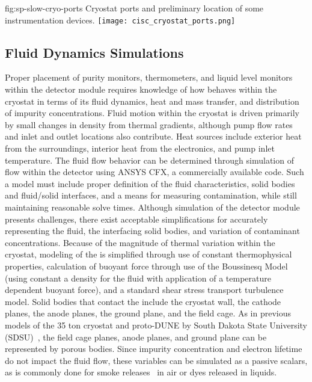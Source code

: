 \begin{dunefigure}{fig:sp-slow-cryo-ports}
{Cryostat ports and preliminary location of some instrumentation devices. }
\texttt{[image: cisc\_cryostat\_ports.png]}
\end{dunefigure}




\subsection{Fluid Dynamics Simulations}
\label{sec:fdgen-slow-cryo-cfd}
Proper placement of purity monitors, thermometers, and liquid level monitors within the detector module requires knowledge of how  behaves within the cryostat in terms of its fluid dynamics, heat and mass transfer, and distribution of impurity concentrations. 
Fluid motion within the cryostat is driven primarily by small changes in density from thermal gradients, although pump flow rates and inlet and outlet locations also contribute. 
Heat sources include exterior heat from the surroundings, interior heat from the electronics, and pump inlet temperature. 
The fluid flow behavior can be determined through simulation of  flow within the detector using ANSYS CFX, a commercially available  code. Such a model must include proper definition of the fluid characteristics, solid bodies and fluid/solid interfaces, and a means for measuring contamination, while still maintaining reasonable solve times.
Although simulation of the detector module presents challenges, there exist acceptable simplifications for accurately representing the fluid, the interfacing solid bodies, and variation of contaminant concentrations. Because of the magnitude of thermal variation within the cryostat, modeling of the  is simplified through use of constant thermophysical properties, calculation of buoyant force through use of the Boussinesq Model (using constant a density for the fluid with application of a temperature dependent buoyant force), and a standard shear stress transport turbulence model. Solid bodies that contact the  include the cryostat wall, the cathode planes, the anode planes, the ground plane, and the field cage. As in previous  models of the 35 ton cryostat and proto-DUNE by South Dakota State University (SDSU)~\cite{docdb-5915}, the field cage planes, anode planes, and ground plane can be represented by porous bodies. Since impurity concentration and electron lifetime do not impact the fluid flow, these variables can be simulated as a passive scalars, as is commonly done for smoke releases~\cite{cfd-1} in air or dyes released in liquids.
